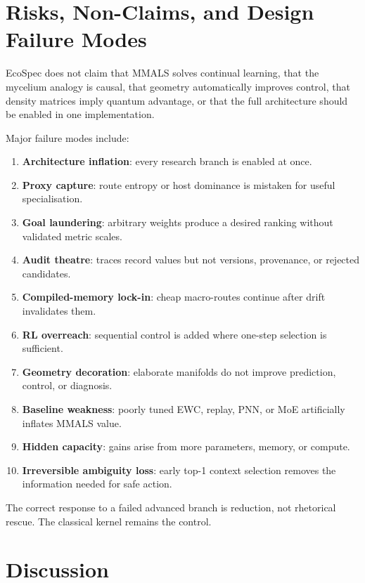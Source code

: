 \documentclass[10pt]{article}
\begin{document}
\section{Risks, Non-Claims, and Design Failure Modes}

\begin{warningbox}
EcoSpec does not claim that MMALS solves continual learning, that the mycelium analogy is causal, that geometry automatically improves control, that density matrices imply quantum advantage, or that the full architecture should be enabled in one implementation.
\end{warningbox}

Major failure modes include:
\begin{enumerate}
  \item \textbf{Architecture inflation}: every research branch is enabled at once.
  \item \textbf{Proxy capture}: route entropy or host dominance is mistaken for useful specialisation.
  \item \textbf{Goal laundering}: arbitrary weights produce a desired ranking without validated metric scales.
  \item \textbf{Audit theatre}: traces record values but not versions, provenance, or rejected candidates.
  \item \textbf{Compiled-memory lock-in}: cheap macro-routes continue after drift invalidates them.
  \item \textbf{RL overreach}: sequential control is added where one-step selection is sufficient.
  \item \textbf{Geometry decoration}: elaborate manifolds do not improve prediction, control, or diagnosis.
  \item \textbf{Baseline weakness}: poorly tuned EWC, replay, PNN, or MoE artificially inflates MMALS value.
  \item \textbf{Hidden capacity}: gains arise from more parameters, memory, or compute.
  \item \textbf{Irreversible ambiguity loss}: early top-1 context selection removes the information needed for safe action.
\end{enumerate}

The correct response to a failed advanced branch is reduction, not rhetorical rescue. The classical kernel remains the control.

\section{Discussion}
\end{document}
